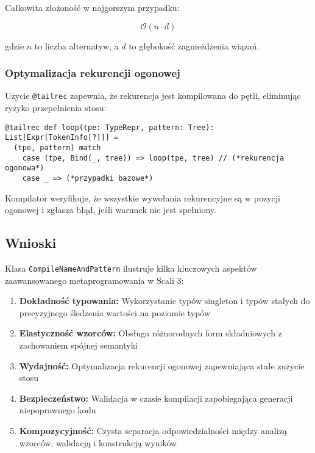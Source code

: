 Całkowita złożoność w najgorszym przypadku:

\begin{equation}
    \mathcal{O}(n \cdot d)
\end{equation}

gdzie \(n\) to liczba alternatyw, a \(d\) to głębokość zagnieżdżenia wiązań.

\subsubsection{Optymalizacja rekurencji ogonowej}
\label{subsubsec:cnp-tail-recursion}

Użycie \texttt{@tailrec} zapewnia, że rekurencja jest kompilowana do pętli, eliminując ryzyko przepełnienia stosu:

\begin{lstlisting}
@tailrec def loop(tpe: TypeRepr, pattern: Tree): List[Expr[TokenInfo[?]]] =
  (tpe, pattern) match
    case (tpe, Bind(_, tree)) => loop(tpe, tree) // (*rekurencja ogonowa*)
    case _ => (*przypadki bazowe*)
\end{lstlisting}

Kompilator weryfikuje, że wszystkie wywołania rekurencyjne są w pozycji ogonowej i zgłasza błąd, jeśli warunek nie jest spełniony.

\subsection{Wnioski}
\label{subsec:cnp-conclusions}

Klasa \texttt{CompileNameAndPattern} ilustruje kilka kluczowych aspektów zaawansowanego metaprogramowania w Scali 3:

\begin{enumerate}
    \item \textbf{Dokładność typowania:} Wykorzystanie typów singleton i typów stałych do precyzyjnego śledzenia wartości na poziomie typów

    \item \textbf{Elastyczność wzorców:} Obsługa różnorodnych form składniowych z zachowaniem spójnej semantyki

    \item \textbf{Wydajność:} Optymalizacja rekurencji ogonowej zapewniająca stałe zużycie stosu

    \item \textbf{Bezpieczeństwo:} Walidacja w czasie kompilacji zapobiegająca generacji niepoprawnego kodu

    \item \textbf{Kompozycyjność:} Czysta separacja odpowiedzialności między analizą wzorców, walidacją i konstrukcją wyników
\end{enumerate}

